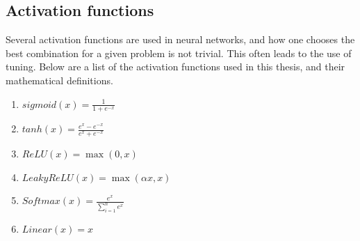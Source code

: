 \subsection*{Activation functions}
Several activation functions are used in neural networks, and how one chooses the best combination for a given problem is not trivial. 
This often leads to the use of tuning. Below are a list of the activation functions used in this thesis, and their mathematical definitions. 

\begin{enumerate}
    \item  $sigmoid(x) = \frac{1}{1+e^{-x}}$
    \item $tanh(x) = \frac{e^x-e^{-x}}{e^x+e^{-x}}$
    \item $ReLU(x) = \max(0,x)$
    \item $LeakyReLU(x) = \max(\alpha x,x)$
    \item $Softmax(x) = \frac{e^x}{\sum_{i=1}^n e^x}$
    \item $Linear(x) = x$
\end{enumerate}


